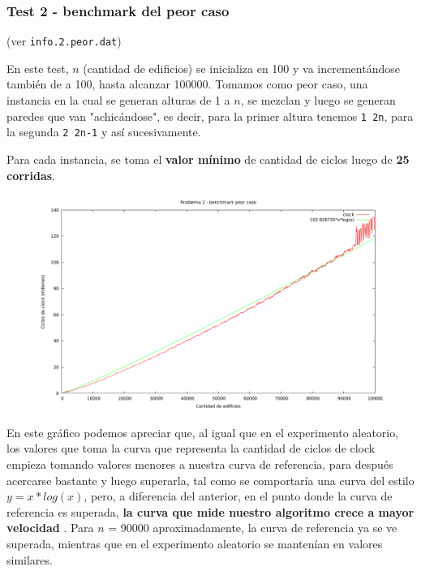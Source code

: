 \newpage


\subsubsection{Test 2 - benchmark del peor caso}

(ver \verb|info.2.peor.dat|) \medskip

En este test, $n$ (cantidad de edificios) se inicializa en 100 y va incrementándose también de a 100, 
hasta alcanzar 100000. Tomamos como peor caso, una instancia en la cual se generan alturas de 1 a $n$, 
se mezclan y luego se generan paredes que van "achicándose", es decir, para la primer altura tenemos 
\verb|1 2n|, para la segunda \verb|2 2n-1| y así sucesivamente.
 
Para cada instancia, se toma el \textbf{valor mínimo} de cantidad de ciclos luego de \textbf{25 corridas}.

\vspace*{0.5cm}

\begin{figure}[h]
  \begin{center}
    \includegraphics[scale=0.35]{imagenes/grafico-2-peor.png}
  \end{center}
\end{figure}

\vspace*{0.5cm}

En este gráfico podemos apreciar que, al igual que en el experimento aleatorio, los valores que toma la curva 
que representa la cantidad de ciclos de clock empieza tomando valores menores a nuestra curva de referencia, 
para después acercarse bastante y luego superarla, tal como se comportaría una curva del estilo $y = x*log(x)$, 
pero, a diferencia del anterior, en el punto donde la curva de referencia es superada, \textbf{la curva que mide nuestro 
algoritmo crece a mayor velocidad} . Para $n$ = 90000 aproximadamente, la curva de referencia ya se ve superada, 
mientras que en el experimento aleatorio se mantenían en valores similares.


